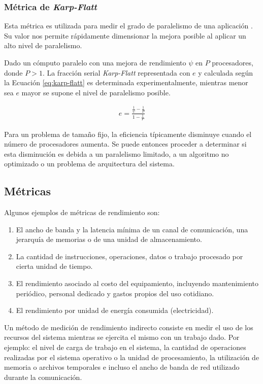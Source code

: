 \documentclass[a4paper]{report}
\begin{document}
\subsubsection{Métrica de {\it Karp-Flatt}}

Esta métrica es utilizada para medir el grado de paralelismo de una aplicación \cite{karp-flatt}. 
Su valor nos permite rápidamente dimensionar la mejora posible al aplicar un alto nivel de paralelismo.

\bigskip

Dado un cómputo paralelo con una mejora de rendimiento $ \psi $ en $ P $ procesadores, donde $ P > 1 $. 
La fracción serial {\it Karp-Flatt} representada con $ e $ y calculada según la Ecuación \ref{eq:karp-flatt} es determinada experimentalmente, 
mientras menor sea $ e $ mayor se supone el nivel de paralelismo posible.

\begin{eqnarray}
\label{eq:karp-flatt}
 e = \frac{\frac{1}{\psi} - \frac{1}{P}}{1 - \frac{1}{P}} 
\end{eqnarray}

Para un problema de tamaño fijo, la eficiencia típicamente disminuye cuando el número de procesadores aumenta. Se puede entonces proceder a determinar si esta disminución es debida a un paralelismo limitado, a un algoritmo no optimizado o un problema de arquitectura del sistema.

\subsection{Métricas}

Algunos ejemplos de métricas de rendimiento son:

\begin{enumerate}
\item El ancho de banda y la latencia mínima de un canal de comunicación,
  una jerarquía de memorias o de una unidad de almacenamiento.
\item La cantidad de instrucciones, operaciones, datos o trabajo procesado
  por cierta unidad de tiempo.
\item El rendimiento asociado al costo del equipamiento, incluyendo mantenimiento
 periódico, personal dedicado y gastos propios del uso cotidiano.
\item El rendimiento por unidad de energía consumida (electricidad).

\end{enumerate}

Un método de medición de rendimiento indirecto consiste en medir el uso de los recursos del sistema mientras se ejercita el mismo con un trabajo dado.
Por ejemplo: el nivel de carga de trabajo en el sistema, la cantidad de operaciones realizadas por el sistema operativo o la unidad de procesamiento, la utilización de memoria o
archivos temporales e incluso el ancho de banda de red utilizado durante la comunicación.
\end{document}
